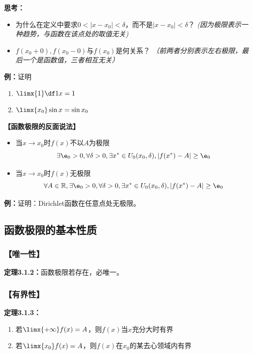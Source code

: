 {\bf 思考：}
\begin{itemize}
  \setlength{\itemindent}{1cm}
  \item 为什么在定义中要求$0<|x-x_0|<\delta$，而不是$|x-x_0|<\delta$？
  {\it (因为极限表示一种趋势，与函数在该点处的取值无关)}
  \item $f(x_0+0),f(x_0-0)$与$f(x_0)$是何关系？
  {\it（前两者分别表示左右极限，最后一个是函数值，三者相互无关）}
\end{itemize}

{\bf 例：}证明
\begin{enumerate}[(1)]
  \setlength{\itemindent}{1cm}
  \item $\limx{1}\df1x=1$
  \item $\limx{x_0}\sin x=\sin x_0$
\end{enumerate}

\begin{shaded}
	{\bf 【函数极限的反面说法】}
	
	\begin{itemize}
	  \item 当$x\to x_0$时$f(x)$不以$A$为极限 
	    $$\exists\e_0>0,\forall\delta>0, \exists x^*\in
	    U_0(x_0,\delta),|f(x^*)-A|\geq\e_0$$ 
	  \item 当$x\to x_0$时$f(x)$无极限
		$$\forall A\in\mathbb{R},\exists\e_0>0,\forall\delta>0, \exists x^*\in
	    U_0(x_0,\delta),|f(x^*)-A|\geq\e_0$$ 
	\end{itemize}
	
	{\bf 例：}证明：Dirichlet函数在任意点处无极限。
\end{shaded}

\subsection{函数极限的基本性质}

\subsubsection{【唯一性】}

{\bf 定理3.1.2：}函数极限若存在，必唯一。

\subsubsection{【有界性】}

{\bf 定理3.1.3：}
\begin{enumerate}[(1)]
  \setlength{\itemindent}{1cm}
  \item 若$\limx{+\infty}f(x)=A$，则$f(x)$当$x$充分大时有界
  \item 若$\limx{x_0}f(x)=A$，则$f(x)$在$x_0$的某去心领域内有界
\end{enumerate}

